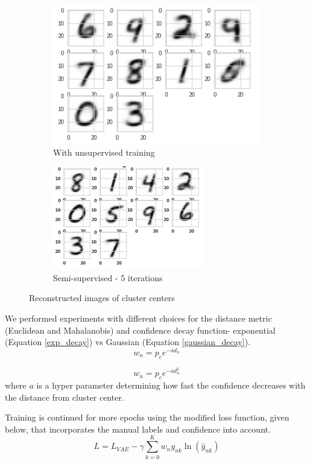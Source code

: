 \documentclass[runningheads]{llncs}
\begin{document}
\begin{figure}[!t]
\centering
\begin{subfigure}[t]{.45\textwidth}
  \centering
  \includegraphics[width=.5\linewidth]{cluster_centers_epoch_1_0_gmm.png}
  \caption{With unsupervised training}
  \label{cluster_center_1}
\end{subfigure}\hfill
\begin{subfigure}[t]{.45\textwidth}
  \centering
  \includegraphics[width=.5\linewidth]{cluster_centers_epoch_5_0_gmm.png}
  \caption{Semi-supervised - 5 iterations}
  \label{cluster_center_5}
\end{subfigure}
\caption{Reconstructed images of cluster centers}
\label{cluster_center}
\end{figure}

We performed experiments with different choices for the distance metric (Euclidean and Mahalanobis) and confidence decay function- exponential (Equation \ref{exp_decay}) vs Gaussian (Equation \ref{gaussian_decay}).
\begin{equation}
    w_n = p_ce^{-a d_n}
    \label{exp_decay}
\end{equation}

\vspace{-0.2in}
\begin{equation}
    w_n = p_ce^{-a d_n^2}
    \label{gaussian_decay}
\end{equation}
where $a$ is a hyper parameter determining how fast the confidence decreases with the distance from cluster center.


Training is continued for more epochs using the modified loss function, given below, that incorporates the manual labels and confidence into account.
\begin{equation} \label{semi_supervised_loss}
L = L_{VAE}  - \gamma \sum_{k=0}^{K}w_{n}y_{nk}\ln(\hat{y}_{nk})
\end{equation}
\end{document}
